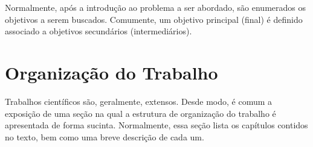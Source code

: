 Normalmente, após a introdução ao problema a ser abordado, são enumerados os objetivos a serem buscados. Comumente, um objetivo principal (final) é definido associado a objetivos secundários (intermediários).

\section{Organização do Trabalho}

Trabalhos científicos são, geralmente, extensos. Desde modo, é comum a exposição de uma seção na qual a estrutura de organização do trabalho é apresentada de forma sucinta. Normalmente, essa seção lista os capítulos contidos no texto, bem como uma breve descrição de cada um.